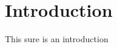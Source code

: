 \documentclass[../main.tex]{subfiles}
\begin{document}
\chapter{Introduction}%
\label{ch:introduction}

This sure is an introduction
\end{document}
